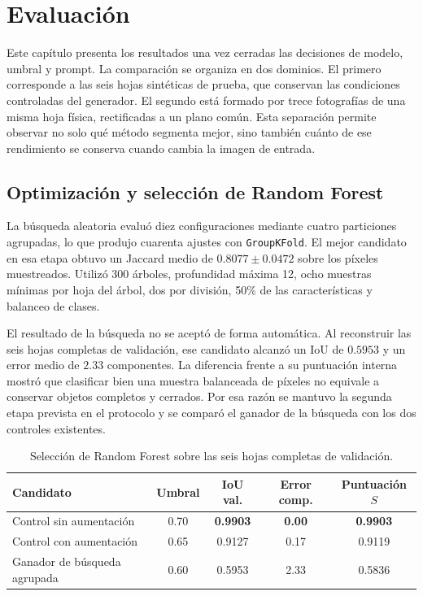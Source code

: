 \chapter{Evaluación}
\label{cap:evaluacion}

Este capítulo presenta los resultados una vez cerradas las decisiones de modelo, umbral y prompt. La comparación se organiza en dos dominios. El primero corresponde a las seis hojas sintéticas de prueba, que conservan las condiciones controladas del generador. El segundo está formado por trece fotografías de una misma hoja física, rectificadas a un plano común. Esta separación permite observar no solo qué método segmenta mejor, sino también cuánto de ese rendimiento se conserva cuando cambia la imagen de entrada.

\section{Optimización y selección de Random Forest}

La búsqueda aleatoria evaluó diez configuraciones mediante cuatro particiones agrupadas, lo que produjo cuarenta ajustes con \texttt{GroupKFold}. El mejor candidato en esa etapa obtuvo un Jaccard medio de $0.8077 \pm 0.0472$ sobre los píxeles muestreados. Utilizó 300 árboles, profundidad máxima 12, ocho muestras mínimas por hoja del árbol, dos por división, 50\% de las características y balanceo de clases.

El resultado de la búsqueda no se aceptó de forma automática. Al reconstruir las seis hojas completas de validación, ese candidato alcanzó un IoU de $0.5953$ y un error medio de $2.33$ componentes. La diferencia frente a su puntuación interna mostró que clasificar bien una muestra balanceada de píxeles no equivale a conservar objetos completos y cerrados. Por esa razón se mantuvo la segunda etapa prevista en el protocolo y se comparó el ganador de la búsqueda con los dos controles existentes.

\begin{table}[htbp]
\centering
\small
\caption{Selección de Random Forest sobre las seis hojas completas de validación.}
\label{tab:seleccion_rf}
\begin{tabularx}{\textwidth}{Ycccc}
\toprule
\textbf{Candidato} & \textbf{Umbral} & \textbf{IoU val.} & \textbf{Error comp.} & \textbf{Puntuación $S$} \\
\midrule
Control sin aumentación & 0.70 & \textbf{0.9903} & \textbf{0.00} & \textbf{0.9903} \\
Control con aumentación & 0.65 & 0.9127 & 0.17 & 0.9119 \\
Ganador de búsqueda agrupada & 0.60 & 0.5953 & 2.33 & 0.5836 \\
\bottomrule
\end{tabularx}
\end{table}

